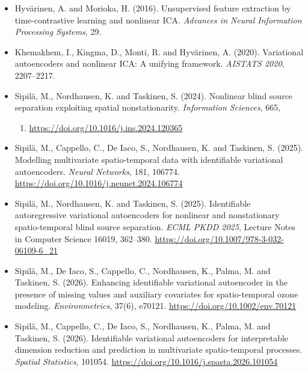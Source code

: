 \documentclass[
]{article}
\providecommand{\tightlist}{%
  \setlength{\itemsep}{0pt}\setlength{\parskip}{0pt}}
\begin{document}
\begin{itemize}
\tightlist
\item
  Hyvärinen, A. and Morioka, H. (2016). Unsupervised feature extraction
  by time-contrastive learning and nonlinear ICA. \emph{Advances in
  Neural Information Processing Systems}, 29.
\item
  Khemakhem, I., Kingma, D., Monti, R. and Hyvärinen, A. (2020).
  Variational autoencoders and nonlinear ICA: A unifying framework.
  \emph{AISTATS 2020}, 2207--2217.
\item
  Sipilä, M., Nordhausen, K. and Taskinen, S. (2024). Nonlinear blind
  source separation exploiting spatial nonstationarity.
  \emph{Information Sciences}, 665,

  \begin{enumerate}
  \def\labelenumi{\arabic{enumi}.}
  \setcounter{enumi}{120364}
  \tightlist
  \item
    \url{https://doi.org/10.1016/j.ins.2024.120365}
  \end{enumerate}
\item
  Sipilä, M., Cappello, C., De Iaco, S., Nordhausen, K. and Taskinen, S.
  (2025). Modelling multivariate spatio-temporal data with identifiable
  variational autoencoders. \emph{Neural Networks}, 181, 106774.
  \url{https://doi.org/10.1016/j.neunet.2024.106774}
\item
  Sipilä, M., Nordhausen, K. and Taskinen, S. (2025). Identifiable
  autoregressive variational autoencoders for nonlinear and
  nonstationary spatio-temporal blind source separation. \emph{ECML PKDD
  2025}, Lecture Notes in Computer Science 16019, 362--380.
  \url{https://doi.org/10.1007/978-3-032-06109-6_21}
\item
  Sipilä, M., De Iaco, S., Cappello, C., Nordhausen, K., Palma, M. and
  Taskinen, S. (2026). Enhancing identifiable variational autoencoder in
  the presence of missing values and auxiliary covariates for
  spatio-temporal ozone modeling. \emph{Environmetrics}, 37(6), e70121.
  \url{https://doi.org/10.1002/env.70121}
\item
  Sipilä, M., Cappello, C., De Iaco, S., Nordhausen, K., Palma, M. and
  Taskinen, S. (2026). Identifiable variational autoencoders for
  interpretable dimension reduction and prediction in multivariate
  spatio-temporal processes. \emph{Spatial Statistics}, 101054.
  \url{https://doi.org/10.1016/j.spasta.2026.101054}
\end{itemize}
\end{document}
